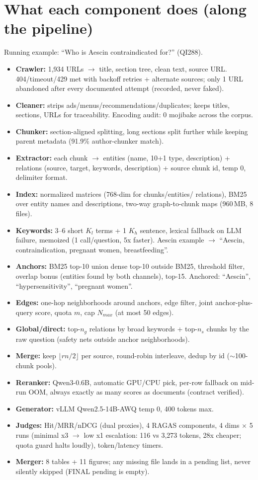 \documentclass[12pt,a4paper]{article}
\begin{document}
\section{What each component does (along the pipeline)}
Running example: ``Who is Aescin contraindicated for?'' (QI288).
\begin{itemize}[leftmargin=*]
\item \textbf{Crawler:} 1,934 URLs $\rightarrow$ title, section tree, clean
text, source URL. 404/timeout/429 met with backoff retries + alternate
sources; only 1 URL abandoned after every documented attempt (recorded, never
faked).
\item \textbf{Cleaner:} strips ads/menus/recommendations/duplicates; keeps
titles, sections, URLs for traceability. Encoding audit: 0 mojibake across the
corpus.
\item \textbf{Chunker:} section-aligned splitting, long sections split further
while keeping parent metadata (91.9\% author-chunker match).
\item \textbf{Extractor:} each chunk $\rightarrow$ entities (name, 10+1 type,
description) + relations (source, target, keywords, description) + source
chunk id, temp 0, delimiter format.
\item \textbf{Index:} normalized matrices (768-dim for chunks/entities/
relations), BM25 over entity names and descriptions, two-way graph-to-chunk
maps (960\,MB, 8 files).
\item \textbf{Keywords:} 3--6 short $K_l$ terms + 1 $K_h$ sentence, lexical
fallback on LLM failure, memoized (1 call/question, 5x faster). Aescin example
$\rightarrow$ ``Aescin, contraindication, pregnant women, breastfeeding''.
\item \textbf{Anchors:} BM25 top-10 union dense top-10 outside BM25, threshold
filter, overlap bonus (entities found by both channels), top-15. Anchored:
``Aescin'', ``hypersensitivity'', ``pregnant women''.
\item \textbf{Edges:} one-hop neighborhoods around anchors, edge filter, joint
anchor-plus-query score, quota $m$, cap $N_{max}$ (at most 50 edges).
\item \textbf{Global/direct:} top-$n_g$ relations by broad keywords +
top-$n_s$ chunks by the raw question (safety nets outside anchor neighborhoods).
\item \textbf{Merge:} keep $\lfloor rn/2\rfloor$ per source, round-robin
interleave, dedup by id ($\sim$100-chunk pools).
\item \textbf{Reranker:} Qwen3-0.6B, automatic GPU/CPU pick, per-row fallback on
mid-run OOM, always exactly as many scores as documents (contract verified).
\item \textbf{Generator:} vLLM Qwen2.5-14B-AWQ temp 0, 400 tokens max.
\item \textbf{Judges:} Hit/MRR/nDCG (dual proxies), 4 RAGAS components, 4 dims
$\times$ 5 runs (minimal x3 $\rightarrow$ low x1 escalation: 116 vs 3,273
tokens, 28x cheaper; quota guard halts loudly), token/latency timers.
\item \textbf{Merger:} 8 tables + 11 figures; any missing file lands in a
pending list, never silently skipped (FINAL pending is empty).
\end{itemize}
\end{document}
